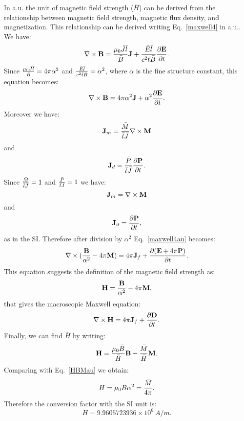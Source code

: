 \documentclass[12pt,a4paper]{article}
\def\barh{9.9605723936\times 10^{6}}
\begin{document}
{\color{web-blue} In a.u. the unit of magnetic field strength ($\bar H$) 
can be derived from the relationship between magnetic field strength,
magnetic flux density, and magnetization. This relationship can
be derived writing Eq.~\ref{maxwell4} in a.u..
We have:
\begin{equation}
\nabla \times {\bf B}= {\mu_0 \bar J \bar l \over \bar B} {\bf J} + 
{\bar E \bar l \over c^2 \bar t \bar B} {\partial {\bf E} \over
\partial t}.
\label{maxwell4gen}
\end{equation}
Since ${\mu_0 \bar J \bar l \over \bar B}=4 \pi \alpha^2$ and 
${\bar E \bar l \over c^2 \bar t \bar B}=\alpha^2$, where $\alpha$ 
is the fine structure constant, this equation becomes:
\begin{equation}
\nabla \times {\bf B}= {4 \pi \alpha^2} {\bf J} + {\alpha^2} 
{\partial {\bf E} \over \partial t}.
\label{maxwell4au}
\end{equation}
Moreover we have:
\begin{equation}
{\bf J}_m={\bar M \over \bar l \bar J} \nabla \times {\bf M}
\end{equation}
and 
\begin{equation}
{\bf J}_d={\bar P \over \bar t \bar J} {\partial {\bf P} \over \partial t}.
\end{equation}
Since ${\bar M \over \bar l \bar J}=1$ and 
${\bar P \over \bar t \bar J}=1$ we have:
\begin{equation}
{\bf J}_m= \nabla \times {\bf M}
\end{equation}
and 
\begin{equation}
{\bf J}_d={\partial {\bf P} \over \partial t},
\end{equation}
as in the SI. Therefore after division by $\alpha^2$ 
Eq.~\ref{maxwell4au} becomes:
\begin{equation}
\nabla \times ({{\bf B}\over \alpha^2} -4\pi {\bf M})= 
{4 \pi} {\bf J}_f +  {\partial ({\bf E}+4\pi {\bf P}) \over \partial t}.
\label{maxwell4au1}
\end{equation}
This equation suggests the definition of the magnetic field strength as:
\begin{equation}
{\bf H}={{\bf B}\over \alpha^2} -4\pi {\bf M},
\label{HBMau}
\end{equation}
that gives the macroscopic Maxwell equation:
\begin{equation}
\nabla \times {\bf H}= 
{4 \pi} {\bf J}_f +  {\partial {\bf D} \over \partial t}.
\end{equation}
Finally, we can find $\bar H$ by writing:
\begin{equation}
{\bf H} = {\mu_0 \bar B \over \bar H} {\bf B} - {\bar M \over \bar H} {\bf M}.
\label{HBMgen}
\end{equation}
Comparing with Eq.~\ref{HBMau} we obtain:
\begin{equation}
\bar H={\mu_0 \bar B \alpha^2} = {\bar M \over 4 \pi}.
\end{equation}
Therefore the conversion factor with the SI unit is:
\begin{equation}
\bar H = \barh\ A/m.
\end{equation}
}
\\
\end{document}
